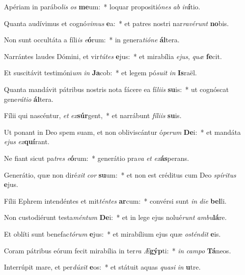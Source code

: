 \item Apériam in parábo\textit{lis} \textit{os} \textbf{me}um:~* loquar propositió\textit{nes} \textit{ab} \textit{in}\textbf{í}tio.
\item Quanta audívimus et cognó\textit{vi}\textit{mus} \textbf{e}a:~* et patres nostri nar\textit{ra}\textit{vé}\textit{runt} \textbf{no}bis.
\item Non sunt occultáta a fíli\textit{is} \textit{e}\textbf{ó}rum:~* in genera\textit{ti}\textit{ó}\textit{ne} \textbf{ál}tera.
\item Narrántes laudes Dómini, et vir\textit{tú}\textit{tes} \textbf{e}jus:~* et mirabília \textit{e}\textit{jus}, \textit{quæ} \textbf{fe}cit.
\item Et suscitávit testimóni\textit{um} \textit{in} \textbf{Ja}cob:~* et legem pó\textit{su}\textit{it} \textit{in} \textbf{Is}raël.
\item Quanta mandávit pátribus nostris nota fácere ea fí\textit{li}\textit{is} \textbf{su}is:~* ut cognóscat gene\textit{rá}\textit{ti}\textit{o} \textbf{ál}tera.
\item Fílii qui nascéntur, \textit{et} \textit{ex}\textbf{súr}gent,~* et narrábunt \textit{fí}\textit{li}\textit{is} \textbf{su}is.
\item Ut ponant in Deo spem suam, et non obliviscántur ó\textit{pe}\textit{rum} \textbf{De}i:~* et mandáta \textit{e}\textit{jus} \textit{ex}\textbf{quí}rant.
\item Ne fiant sicut pa\textit{tres} \textit{e}\textbf{ó}rum:~* generátio pra\textit{va} \textit{et} \textit{ex}\textbf{ás}perans.
\item Generátio, quæ non diré\textit{xit} \textit{cor} \textbf{su}um:~* et non est créditus cum Deo \textit{spí}\textit{ri}\textit{tus} \textbf{e}jus.
\item Fílii Ephrem intendéntes et mit\textit{tén}\textit{tes} \textbf{ar}cum:~* convérsi sunt \textit{in} \textit{di}\textit{e} \textbf{bel}li.
\item Non custodiérunt testa\textit{mén}\textit{tum} \textbf{De}i:~* et in lege ejus nolué\textit{runt} \textit{am}\textit{bu}\textbf{lá}re.
\item Et oblíti sunt benefac\textit{tó}\textit{rum} \textbf{e}jus:~* et mirabílium ejus quæ \textit{os}\textit{tén}\textit{dit} \textbf{e}is.
\item Coram pátribus eórum fecit mirabília in ter\textit{ra} \textit{Æ}\textbf{gýp}ti:~* \textit{in} \textit{cam}\textit{po} \textbf{Tá}neos.
\item Interrúpit mare, et per\textit{dú}\textit{xit} \textbf{e}os:~* et státuit aquas \textit{qua}\textit{si} \textit{in} \textbf{u}tre.
